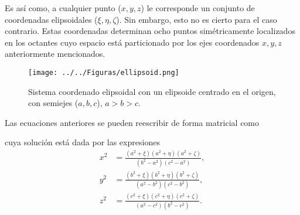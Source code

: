 \noindent Es así como, a cualquier punto ($x,y,z$) le corresponde un conjunto de coordenadas elipsoidales ($\xi,\eta,\zeta$). Sin embargo, esto no es cierto para el caso contrario. Estas coordenadas determinan ocho puntos simétricamente localizados en los octantes cuyo espacio está particionado por los ejes coordenados $x,y,z$ anteriormente mencionados.\\
\begin{figure}[H]
    \centering
    \texttt{[image: ../../Figuras/ellipsoid.png]}    
    \caption{Sistema coordenado elipsoidal con un elipsoide centrado en el origen, con semiejes ($a, b, c$), $a > b > c.$}
    \label{elipse}
\end{figure}
\noindent Las ecuaciones anteriores se pueden reescribir de forma matricial como
\begin{center}
\end{center}
cuya solución está dada por las expresiones
\begin{align}
    x^2&=\frac{(a^2+\xi)(a^2+\eta)(a^2+\zeta)}{(b^2-a^2)(c^2-a^2)},\label{x_elips}\\
     y^2&=\frac{(b^2+\xi)(b^2+\eta)(b^2+\zeta)}{(a^2-b^2)(c^2-b^2)},\label{y_elips}\\
     z^2&=\frac{(c^2+\xi)(c^2+\eta)(c^2+\zeta)}{(a^2-c^2)(b^2-c^2)}. \label{z_elips}    
\end{align}

